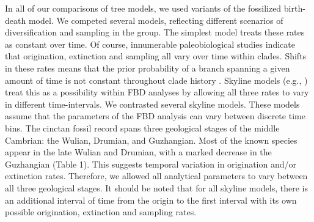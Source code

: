 \documentclass{article}
\begin{document}
In all of our comparisons of tree models, we used variants of the fossilized birth-death model.
We competed several models, reflecting different scenarios of diversification and sampling in the group.
The simplest model treats these rates as constant over time.  
Of course, innumerable paleobiological studies indicate that origination, extinction and sampling all vary over time within clades.  Shifts in these rates means that the prior probability of a branch spanning a given amount of time is not constant throughout clade history \citep{Wagner2019}. %
Skyline models (e.g., \citealp{Stadler2013b}) treat this as a possibility within FBD analyses by allowing all three rates to vary in different time-intervals. 
We contrasted several skyline models. %
These models assume that the parameters of the FBD analysis can vary between discrete time bins. The cinctan fossil record spans three geological stages of the middle Cambrian: the Wulian, Drumian, and Guzhangian. Most of the known species appear in the late Wulian and Drumian, with a marked decrease in the Guzhangian (Table 1).  This suggests temporal variation in origination and/or extinction rates.
Therefore, we allowed all analytical parameters to vary between all three geological stages.
It should be noted that for all skyline models, there is an additional interval of time from the origin to the first interval with its own possible origination, extinction and sampling rates.
\end{document}
